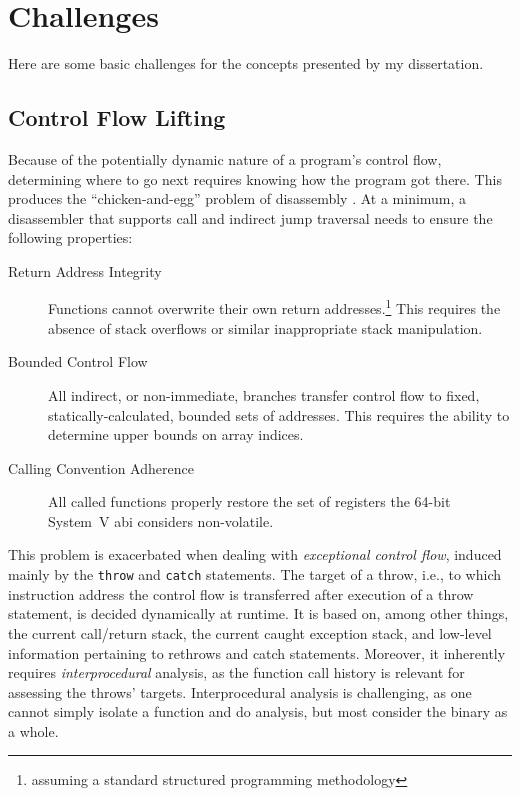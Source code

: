 \section{Challenges}
Here are some basic challenges for the concepts presented by my dissertation.

\subsection{Control Flow Lifting}\label{challenges-cfg}
Because of the potentially dynamic nature of a program's control flow, determining where to go next requires knowing how the program got there.
This produces the ``chicken-and-egg'' problem of disassembly \autocite{schwartz2002disassembly}.
At a minimum, a disassembler that supports call and indirect jump traversal needs to ensure the following properties:
\begin{description}
  \item[Return Address Integrity] Functions cannot overwrite their own return addresses.\footnote{assuming a standard structured programming methodology} This requires the absence of stack overflows or similar inappropriate stack manipulation.
  \item[Bounded Control Flow] All indirect, or non-immediate, branches transfer control flow to fixed, statically-calculated, bounded sets of addresses. This requires the ability to determine upper bounds on array indices.
  \item[Calling Convention Adherence] All called functions properly restore the set of registers the 64-bit System~V \ac{abi} considers non-volatile.
\end{description}

This problem is exacerbated when dealing with \emph{exceptional control flow}, induced mainly by the \Cpp{} \lstinline{throw} and \lstinline{catch} statements.
The target of a throw, i.e., to which instruction address the control flow is transferred after execution of a throw statement, is decided dynamically at runtime.
It is based on, among other things, the current call/return stack, the current caught exception stack, and low-level information pertaining to rethrows and catch statements.
Moreover, it inherently requires \emph{interprocedural} analysis, as the function call history is relevant for assessing the throws’ targets.
Interprocedural analysis is challenging, as one cannot simply isolate a function and do analysis, but most consider the binary as a whole.

